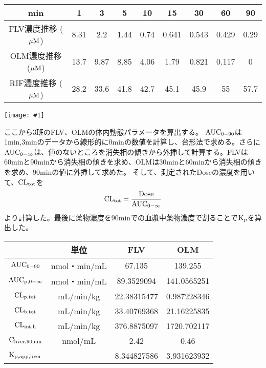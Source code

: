\documentclass[a4paper,papersize,dvipdfmx]{jsarticle}
\newcommand{\pict}[2]{\begin{center} \texttt{[image: \#1]} \end{center}}   %
\begin{document}
\begin{table}[H]
\begin{center}
\begin{tabular}{|c|c|c|c|c|c|c|c|c|}
\hline
min                 & 1    & 3    & 5    & 10   & 15    & 30    & 60    & 90   \\ \hline
FLV濃度推移 ($\rm \mu M$)& 8.31 & 2.2  & 1.44 & 0.74 & 0.641 & 0.543 & 0.429 & 0.29 \\ \hline
OLM濃度推移 ($\rm \mu M$)  & 13.7 & 9.87 & 8.85 & 4.06 & 1.79  & 0.821 & 0.117 &   0   \\ \hline
RIF濃度推移 ($\rm \mu M$)    & 28.2 & 33.6 & 41.8 & 42.7 & 45.1  & 45.9  & 55    & 57.7 \\ \hline
\end{tabular}
\end{center}
\end{table}

\pict{imgs/3p.png}{10}

ここから3班のFLV、OLMの体内動態パラメータを算出する。
$\rm AUC_{0-90}$は1min,3minのデータから線形的に0minの数値を計算し、台形法で求める。さらに$\rm AUC_{0-\infty}$は、値のないところを消失相の傾きから外挿して計算する。FLVは60minと90minから消失相の傾きを求め、OLMは30minと60minから消失相の傾きを求め、90minの値に外挿して求めた。
そして、測定されたDoseの濃度を用いて、$\rm CL_{tot}$を
\[\rm CL_{tot}=\frac{Dose}{AUC_{0-\infty}}\]
より計算した。最後に薬物濃度を90minでの血漿中薬物濃度で割ることで$\rm K_p$を算出した。

\begin{table}[H]
\begin{center}
\begin{tabular}{|c|c|c|c|}
\hline
& 単位            & FLV         & OLM                      \\ \hline
$\rm AUC_{0-90}$   & nmol・min/mL & 67.135      & 139.255     \\ \hline
$\rm AUC_{p, 0-\infty}$ & nmol・min/mL & 89.3529094  & 141.0565251 \\ \hline
$\rm CL_{p, tot}$      & mL/min/kg   & 22.38315477 & 0.987228346 \\ \hline
$\rm CL_{b,tot}$       & mL/min/kg   & 33.40769368 & 21.16225835 \\ \hline
$\rm CL_{int,h}$       & mL/min/kg   & 376.8875097 & 1720.702117 \\ \hline
$\rm C_{liver,90min}$  & nmol/mL     & 2.42        & 0.46        \\ \hline
$\rm K_{p,app,liver}$  &             & 8.344827586 & 3.931623932 \\ \hline
\end{tabular}
\end{center}
\end{table}
\end{document}
